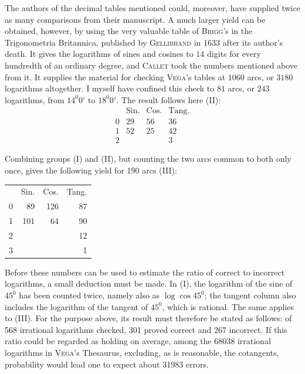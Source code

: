 The authors of the decimal tables mentioned could, moreover, have supplied twice as many comparisons from their manuscript. A much larger yield can be obtained, however, by using the very valuable table of \textsc{Brigg}'s in the Trigonometria Britannica, published by \textsc{Gellibrand} in 1633 after its author's death. It gives the logarithms of sines and cosines to \(14\) digits for every hundredth of an ordinary degree, and \textsc{Callet} took the numbers mentioned above from it. It supplies the material for checking \textsc{Vega}'s tables at \(1060\) arcs, or \(3180\) logarithms altogether. I myself have confined this check to \(81\) arcs, or \(243\) logarithms, from \(14^{0}0'\) to \(18^{0}0'\). The result follows here (II):
\[
\begin{array}{rccc}
 & \mathrm{Sin.} & \mathrm{Cos.} & \mathrm{Tang.} \\
0 & 29 & 56 & 36 \\
1 & 52 & 25 & 42 \\
2 &    &    & 3
\end{array}
\]
\par
{}
Combining groups (I) and (II), but counting the two arcs common to both only once, gives the following yield for 190 arcs (III):
\begin{center}
\begin{tabular}{rrrr}
 & Sin. & Cos. & Tang. \\
0 & 89 & 126 & 87 \\
1 & 101 & 64 & 90 \\
2 & & & 12 \\
3 & & & 1
\end{tabular}
\end{center}
Before these numbers can be used to estimate the ratio of correct to incorrect logarithms, a small deduction must be made. In (I), the logarithm of the sine of $45^{0}$ has been counted twice, namely also as $\log\cos45^{0}$; the tangent column also includes the logarithm of the tangent of $45^{0}$, which is rational. The same applies to (III). For the purpose above, its result must therefore be stated as follows: of 568 irrational logarithms checked, 301 proved correct and 267 incorrect. If this ratio could be regarded as holding on average, among the 68038 irrational logarithms in \textsc{Vega}'s Thesaurus, excluding, as is reasonable, the cotangents, probability would lead one to expect about 31983 errors.

